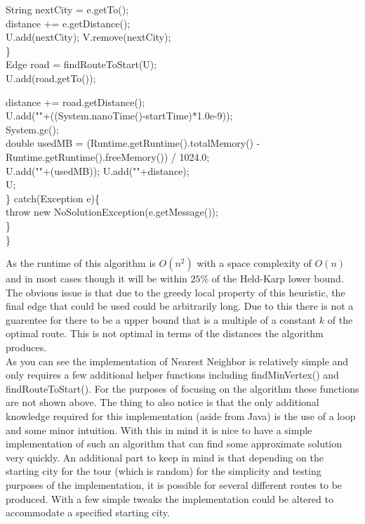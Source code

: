 \documentclass[midd]{thesis}
\newcommand{\tab}{\hspace*{2em}}
\begin{document}
\begin{codebox}
\tab\tab\tab String nextCity = e.getTo();\\
\tab\tab\tab distance += e.getDistance();\\
\tab\tab\tab U.add(nextCity); V.remove(nextCity);\\
\tab\tab\}\\\End
\tab\tab Edge road = findRouteToStart(U);\\
\tab\tab U.add(road.getTo());\\
\end{codebox}
\begin{codebox}
\tab\tab distance += road.getDistance();\\
\tab\tab U.add(""+((System.nanoTime()-startTime)*1.0e-9));\\
\tab\tab System.gc();\\
\tab\tab double usedMB = (Runtime.getRuntime().totalMemory() -\\
\tab\tab\tab\tab Runtime.getRuntime().freeMemory()) / 1024.0;\\
\tab\tab U.add(""+(usedMB)); U.add(""+distance);\\
\tab\tab \Return U;\\
\tab \} catch(Exception e)\{\\
\tab\tab throw new NoSolutionException(e.getMessage());\\
\tab\}\\
\}
\end{codebox}
As the runtime of this algorithm is $O(n^2)$\cite{htspc} with a space complexity of $O(n)$ and in most cases though it will be within $25\%$ of the Held-Karp lower bound\cite{htspc}. The obvious issue is that due to the greedy local property of this heuristic, the final edge that could be used could be arbitrarily long. Due to this there is not a guarentee for there to be a upper bound that is a multiple of a constant $k$ of the optimal route. This is not optimal in terms of the distances the algorithm produces.\\
\tab As you can see the implementation of Nearest Neighbor is relatively simple and only requires a few additional helper functions including findMinVertex() and\\ findRouteToStart(). For the purposes of focusing on the algorithm these functions are not shown above. The thing to also notice is that the only additional knowledge required for this implementation (aside from Java) is the use of a loop and some minor intuition. With this in mind it is nice to have a simple implementation of such an algorithm that can find some approximate solution very quickly. An additional part to keep in mind is that depending on the starting city for the tour (which is random) for the simplicity and testing purposes of the implementation, it is possible for several different routes to be produced. With a few simple tweaks the implementation could be altered to accommodate a specified starting city. \\
\end{document}
